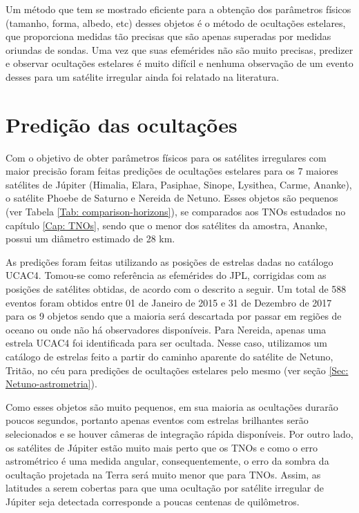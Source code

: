 \documentclass[12pt,a4paper]{monografia}
\begin{document}
Um método que tem se mostrado eficiente para a obtenção dos parâmetros físicos (tamanho, forma, albedo, etc) desses objetos é o método de ocultações estelares, que proporciona medidas tão precisas que são apenas superadas por medidas oriundas de sondas. Uma vez que suas efemérides não são muito precisas, predizer e observar ocultações estelares é muito difícil e nenhuma observação de um evento desses para um satélite irregular ainda foi relatado na literatura.


\section{Predição das ocultações}
\label{Sec: Irr-predic}

\indent \indent Com o objetivo de obter parâmetros físicos para os satélites irregulares com maior precisão foram feitas predições de ocultações estelares para os 7 maiores satélites de Júpiter (Himalia, Elara, Pasiphae, Sinope, Lysithea, Carme, Ananke), o satélite Phoebe de Saturno e Nereida de Netuno. Esses objetos são pequenos (ver Tabela \ref{Tab: comparison-horizons}), se comparados aos TNOs estudados no capítulo \ref{Cap: TNOs}, sendo que o menor dos satélites da amostra, Ananke, possui um diâmetro estimado de 28 km.

As predições foram feitas utilizando as posições de estrelas dadas no catálogo UCAC4. Tomou-se como referência as efemérides do JPL, corrigidas com as posições de satélites obtidas, de acordo com o descrito a seguir. Um total de 588 eventos foram obtidos entre 01 de Janeiro de 2015 e 31 de Dezembro de 2017 para os 9 objetos sendo que a maioria será descartada por passar em regiões de oceano ou onde não há observadores disponíveis. Para Nereida, apenas uma estrela UCAC4 foi identificada para ser ocultada. Nesse caso, utilizamos um catálogo de estrelas feito a partir do caminho aparente do satélite de Netuno, Tritão, no céu para predições de ocultações estelares pelo mesmo (ver seção \ref{Sec: Netuno-astrometria}).

Como esses objetos são muito pequenos, em sua maioria as ocultações durarão poucos segundos, portanto apenas eventos com estrelas brilhantes serão selecionados e se houver câmeras de integração rápida disponíveis. Por outro lado, os satélites de Júpiter estão muito mais perto que os TNOs e como o erro astrométrico é uma medida angular, consequentemente, o erro da sombra da ocultação projetada na Terra será muito menor que para TNOs. Assim, as latitudes a serem cobertas para que uma ocultação por satélite irregular de Júpiter seja detectada corresponde a poucas centenas de quilômetros.
\end{document}
